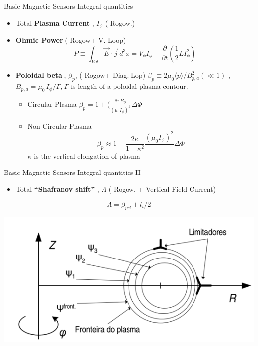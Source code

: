 \documentclass{beamer}
\begin{document}
\begin{frame}{Basic Magnetic Sensors } { Integral  quantities}
   \begin{itemize}
 	\item Total \textbf{ Plasma Current }, $I_\phi$  ( Rogow.)
	\item  \textbf{ Ohmic Power}  ( Rogow+ V. Loop)
	$$P \equiv \int_{Vol} \vec{E} \cdot \vec{j}\, d^3 x = V_\phi I_\phi - \frac{\partial}{\partial t} (\frac{1}{2} L I_\phi^2 ) $$ 

	\item \textbf{ Poloidal beta }, $\beta_p $,  ( Rogow+ Diag. Lop)
	 $	\beta_p \equiv 2 \mu_0 \langle p \rangle  / B_{p,a}^2 ( \ll 1)$ , $B_{p,a} = \mu_0\, I_\phi / \Gamma $,  $ \Gamma$ is length of a poloidal plasma contour.
   	\begin{itemize}
 		\item Circular Plasma $  \beta_p = 1+ (\frac{8 \pi B_\phi}{(\mu_0 I_\phi)^2} \, \Delta \Phi $
	 	\item Non-Circular Plasma  
		$$  \beta_p  \approx  1  + \frac{2 \kappa}{1 +\kappa^2}  \frac{(\mu_0 I_\phi)^2} \, \Delta \Phi$$ 
		$\kappa$ is the vertical elongation of plasma
	    \end{itemize}
     \end{itemize}
\end{frame}


\begin{frame}{Basic Magnetic Sensors } {Integral  quantities II}
   \begin{itemize}
 	\item Total \textbf{“Shafranov shift” }, $\Lambda$  ( Rogow. + Vertical Field Current)
     \end{itemize}
$$\Lambda=\beta_{pol} + l_i /2 $$

	\begin{center}
		\includegraphics[width=.75\columnwidth]{shafran.png}
	\end{center}
\end{frame}
\end{document}

